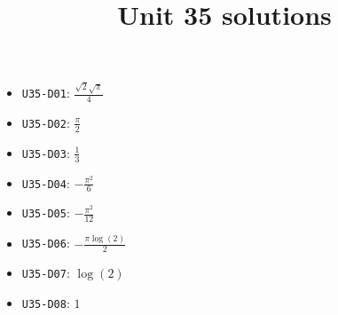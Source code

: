 \title{Unit 35 solutions}\maketitle\begin{itemize}
  \item \texttt{U35-D01}: $\frac{\sqrt{2} \sqrt{\pi}}{4}$
  \item \texttt{U35-D02}: $\frac{\pi}{2}$
  \item \texttt{U35-D03}: $\frac{1}{3}$
  \item \texttt{U35-D04}: $- \frac{\pi^{2}}{6}$
  \item \texttt{U35-D05}: $- \frac{\pi^{2}}{12}$
  \item \texttt{U35-D06}: $- \frac{\pi \log{\left(2 \right)}}{2}$
  \item \texttt{U35-D07}: $\log{\left(2 \right)}$
  \item \texttt{U35-D08}: $1$
\end{itemize}

